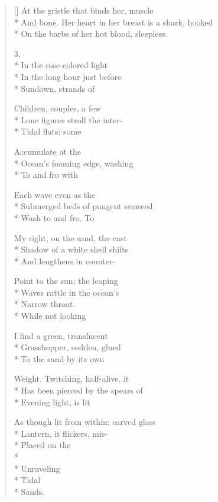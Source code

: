 \begin{verse}[\versewidth]
At the gristle that binds her, muscle\\*
And bone.   Her heart in her breast is a shark, hooked\\*
On the barbs of her hot blood, sleepless.

3.\\*
In the rose-colored light\\*
In the long hour just before \\*
Sundown, strands of

Children, couples, a few\\*
Lone figures stroll the inter-\\*
Tidal flats; some

Accumulate at the \\*
Ocean's foaming edge, washing\\*
To and fro with

Each wave    even   as the\\*
Submerged beds of pungent seaweed\\*
Wash to and fro.     To

My right, on the sand, the cast\\*
Shadow of a white shell shifts\\*
And lengthens in counter-

Point to the sun; the leaping\\*
Waves rattle in the ocean's\\*
Narrow throat.     \\*
                                  While not looking

I find a green, translucent\\*
Grasshopper, sodden, glued\\*
To the sand by its own 

Weight. Twitching, half-alive, it\\*
Has been pierced by the spears of\\*
Evening light, is lit

As though lit from within: carved glass\\*
Lantern, it flickers, mis-\\*
Placed on the\\*
~\\*
                             Unraveling\\*
Tidal\\*
 \qquad Sands.
\end{verse}
